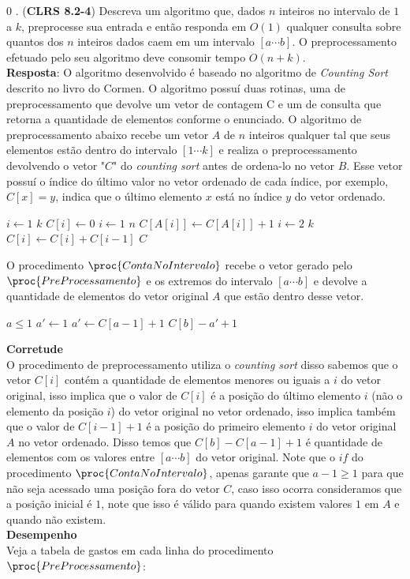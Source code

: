 0
. (\textbf{CLRS 8.2-4}) Descreva um algoritmo que, dados $n$ inteiros 
no intervalo de $1$ a $k$, preprocesse sua entrada e então responda em $O(1)$ 
qualquer consulta sobre quantos dos $n$ inteiros dados caem em um intervalo $[a 
\cdots b]$. O preprocessamento efetuado pelo seu algoritmo deve consomir tempo 
$O(n + k)$.
\\[6pt]
\textbf{Resposta}: O algoritmo desenvolvido é baseado no algoritmo de 
\textit{Counting Sort} descrito no livro do Cormen. O algoritmo possuí duas 
rotinas, uma de preprocessamento que devolve um vetor de contagem C e um de 
consulta que retorna a quantidade de elementos conforme o enunciado. O algoritmo 
de preprocessamento abaixo recebe um vetor $A$ de $n$ inteiros qualquer tal que 
seus elementos estão dentro do intervalo $[1 \cdots k]$ e  realiza o 
preprocessamento devolvendo o vetor "$C$" do \textit{counting sort} antes de 
ordena-lo no vetor $B$. Esse vetor possuí o índice do último valor no vetor 
ordenado de cada índice, por exemplo, $C[x] = y$, indica que o último elemento 
$x$ está no índice $y$ do vetor ordenado.

\begin{codebox}
\li    \For $i \gets 1$ \To $k$
\li    \Do
            $C[i] \gets 0$
       \End
\li    \For $i \gets 1$ \To $n$
\li    \Do
            $C[A[i]] \gets C[A[i]] + 1$
       \End
\li    \For $i \gets 2$ \To $k$
\li    \Do
            $C[i] \gets C[i] + C[i-1]$
       \End
\li    \Return $C$
\End
\end{codebox}
O procedimento $\proc{ContaNoIntervalo}$ recebe o vetor gerado pelo 
$\proc{PreProcessamento}$ e os extremos do intervalo $[a \cdots b]$ e devolve a 
quantidade de elementos do vetor original $A$ que estão dentro desse vetor.
\begin{codebox}
    \li \If $a \leq 1$
    \li     \Then
            $a' \gets 1$
    \li \Else
            $a' \gets C[a-1] + 1$
        \End
    \li \Return $C[b] - a' + 1$
\End
\end{codebox}
\textbf{Corretude}
\\[6pt]
O procedimento de preprocessamento utiliza o \textit{counting sort} disso 
sabemos que o vetor $C[i]$ contém a quantidade de elementos menores ou iguais a 
$i$ do vetor original, isso implica que o valor de $C[i]$ é a posição do último 
elemento $i$ (não o elemento da posição $i$) do vetor original no vetor 
ordenado, isso implica também que o valor de $C[i-1] + 1$ é a posição do 
primeiro elemento $i$ do vetor original $A$ no vetor ordenado. Disso temos que 
$C[b] - C[a-1] + 1$ é quantidade de elementos com os valores entre $[a \cdots 
b]$ do vetor original. Note que o $if$ do procedimento 
$\proc{ContaNoIntervalo}$, apenas garante que $a-1 \geq 1$ para que não seja 
acessado uma posição fora do vetor $C$, caso isso ocorra consideramos que a 
posição inicial é $1$, note que isso é válido para quando existem valores $1$ em 
$A$ e quando não existem.
\\[6pt]
\textbf{Desempenho}
\\[6pt]
Veja a tabela de gastos em cada linha do procedimento $\proc{PreProcessamento}$:


